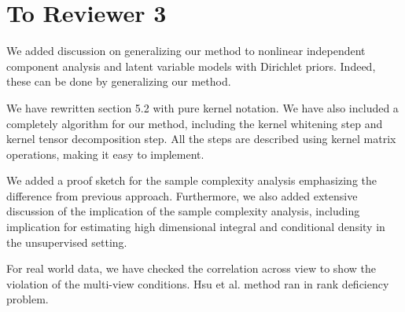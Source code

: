 \documentclass{article}
\begin{document}
\section*{To Reviewer 3}

We added discussion on generalizing our method to nonlinear independent component analysis and latent variable models with Dirichlet priors. Indeed, these can be done by generalizing our method.

We have rewritten section 5.2 with pure kernel notation.
We have also included a completely algorithm for our method, including the kernel whitening step and kernel tensor decomposition step. All the steps are described using kernel matrix operations, making it easy to implement.

We added a proof sketch for the sample complexity analysis emphasizing the difference from previous approach. Furthermore, we also added extensive discussion of the implication of the sample complexity analysis, including implication for estimating high dimensional integral and conditional density in the unsupervised setting.

For real world data, we have checked the correlation across view to show the violation of the multi-view conditions. Hsu et al. method ran in rank deficiency problem.
\end{document}
